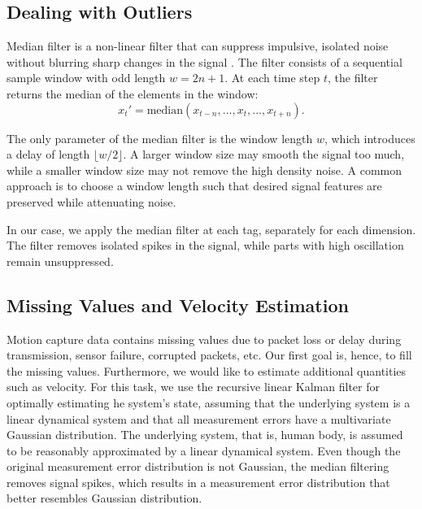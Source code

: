 
\subsection{Dealing with Outliers}
\label{sec:ar:noise:median}


Median filter is a non-linear filter that can suppress impulsive, isolated noise without blurring sharp changes in the signal \citep{Yin1996median}. The filter consists of a sequential sample window with odd length $w=2n+1$. At each time step $t$, the filter returns the median of the elements in the window:
\begin{equation}
	x_t' = \text{median}(x_{t-n}, ..., x_t, ..., x_{t+n}).
\end{equation}

The only parameter of the median filter is the window length $w$, which introduces a delay of length $\lfloor w/2 \rfloor$. A larger window size may smooth the signal too much, while a smaller window size may not remove the high density noise. A common approach is to choose a window length such that desired signal features are preserved while attenuating noise.


In our case, we apply the median filter at each tag, separately for each dimension. The filter removes isolated spikes in the signal, while parts with high oscillation remain unsuppressed.



\subsection{Missing Values and Velocity Estimation}
\label{sec:ar:noise:kamlan}

Motion capture data contains missing values due to packet loss or delay during transmission, sensor failure, corrupted packets, etc. Our first goal is, hence, to fill the missing values. Furthermore, we would like to estimate additional quantities such as velocity. For this task, we use the recursive linear Kalman filter \citep{Kalman1960} for optimally estimating he system's state, assuming that the underlying system is a linear dynamical system and that all measurement errors have a multivariate Gaussian distribution. The underlying system, that is, human body, is assumed to be reasonably approximated by a linear dynamical system. Even though the original measurement error distribution is not Gaussian, the median filtering removes signal spikes, which results in a measurement error distribution that better resembles Gaussian distribution.

